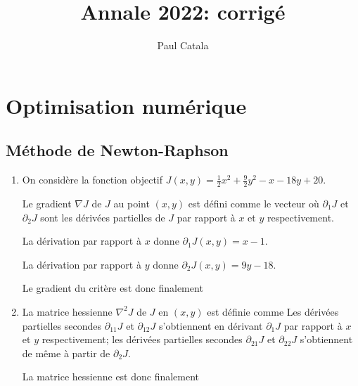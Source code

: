 \documentclass{article}
\title{Annale 2022: corrigé}
\date{}
\author{Paul Catala}
\begin{document}
\maketitle

\section{Optimisation numérique}

\subsection{Méthode de Newton-Raphson}

\begin{enumerate}
	\item On considère la fonction objectif $J(x,y) = \displaystyle \frac{1}{2}x^2 + \frac{9}{2}y^2 - x - 18y + 20$.
	
	Le gradient $\nabla J$ de $J$ au point $(x,y)$ est défini comme le vecteur
	où $\partial_1 J$ et $\partial_2 J$ sont les dérivées partielles de $J$ par rapport à $x$ et $y$ respectivement.
	
	La dérivation par rapport à $x$ donne $\partial_1 J(x,y) = x-1$.
	
	La dérivation par rapport à $y$ donne $\partial_2 J(x,y) = 9y-18$.
	
	Le gradient du critère est  donc finalement
	
	\item La matrice hessienne $\nabla^2 J$ de $J$ en $(x,y)$ est définie comme
	Les dérivées partielles secondes $\partial_{11} J$ et $\partial_{12} J$ s'obtiennent en dérivant $\partial_{1} J$ par rapport à $x$ et $y$ respectivement; les dérivées partielles secondes $\partial_{21} J$ et $\partial_{22} J$ s'obtiennent de même à partir de $\partial_{2} J$.
	
	La matrice hessienne est donc finalement
	

\end{enumerate}
\end{document}
